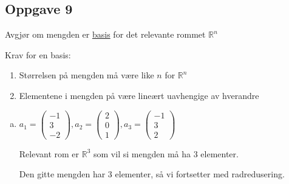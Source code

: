 \documentclass{article}
\newcommand{\vect}[1]{\begin{pmatrix} #1 \end{pmatrix}}
\begin{document}
\vspace{4em}
\subsection*{Oppgave 9}
Avgjør om mengden er \underline{basis} for det relevante rommet $\mathbb{R}^n$

Krav for en basis:
\begin{enumerate}
    \item Størrelsen på mengden må være like $n$ for $\mathbb{R}^n$
    \item Elementene i mengden på være lineært uavhengige av hverandre
\end{enumerate}

\begin{enumerate}[d)]

\item \(
a_1=\vect{-1\\3\\-2},
a_2=\vect{2\\0\\1},
a_3=\vect{-1\\3\\2}
\)

\vspace{1em}

Relevant rom er $\mathbb{R}^3$ som vil si mengden må ha 3 elementer.

Den gitte mengden har 3 elementer, så vi fortsetter med radredusering.

\vspace{1em}


\end{enumerate}
\end{document}
